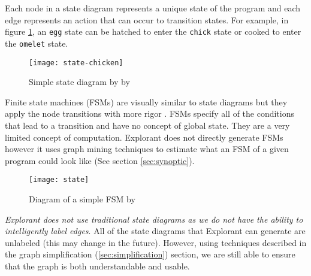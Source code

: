 Each node in a state diagram represents a unique state of the program and each edge represents an action that can occur to transition states. For example, in figure \ref{fig:state-chicken}, an \texttt{egg} state can be hatched to enter the \texttt{chick} state or cooked to enter the \texttt{omelet} state.

\begin{figure}[!ht]
\centering
\texttt{[image: state-chicken]}
    \caption{Simple state diagram by by \cite{state}}
    \label{fig:state-chicken}
\end{figure}

Finite state machines (FSMs) are visually similar to state diagrams but they apply the node transitions with more rigor \cite[p~55]{fsm}. FSMs specify all of the conditions that lead to a transition and have no concept of global state. They are a very limited concept of computation. Explorant does not directly generate FSMs however it uses graph mining techniques to estimate what an FSM of a given program could look like (See section \ref{sec:synoptic}).



\begin{figure}[!ht]
\centering
\texttt{[image: state]}
    \caption{Diagram of a simple FSM by \cite{fsm}}
    \label{fig:fsm-labeled}
\end{figure}



\textit{Explorant does not use traditional state diagrams as we do not have the ability to intelligently label edges}. All of the state diagrams that Explorant can generate are unlabeled (this may change in the future). However, using techniques described in the graph simplification (\ref{sec:simplification}) section, we are still able to ensure that the graph is both understandable and usable. 

